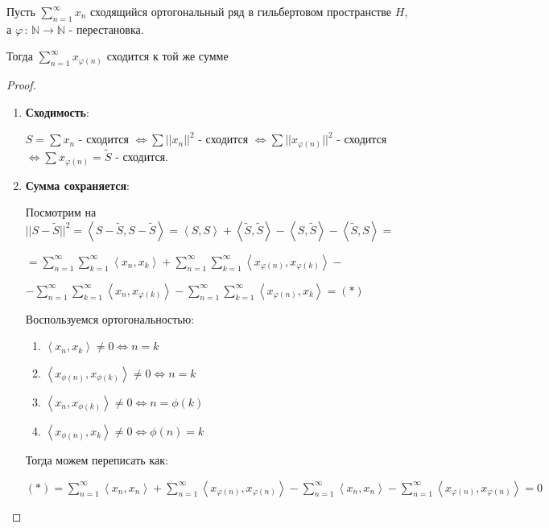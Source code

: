 \begin{consequence}
    Пусть $\sum_{n = 1}^{\infty} x_n$ сходящийся ортогональный ряд в гильбертовом пространстве $H$, а $\varphi \, : \, \mathbb{N} \to \mathbb{N}$ - перестановка.
    
    Тогда $\sum_{n = 1}^\infty x_{\varphi(n)} $ сходится к той же сумме 
\end{consequence}

\begin{proof}
    \begin{enumerate}
        \item {
        \textbf{Сходимость}:

        $S = \sum x_n$ - сходится $\Longleftrightarrow \sum ||x_n||^2$ - сходится $\Longleftrightarrow \sum ||x_{\varphi(n)}||^2$ - сходится $\Longleftrightarrow \sum x_{\varphi(n)} = \tilde{S}$ - сходится.
        }
        \item {
        \textbf{Сумма сохраняется}:

        
        Посмотрим на $||S - \tilde{S}||^2 = \left <  S - \tilde{S}, S - \tilde{S} \right > = \left < S, S \right > + \left < \tilde{S}, \tilde{S} \right > - \left < S, \tilde{S} \right > - \left < \tilde{S}, S \right > = $
        
        $= \sum_{n = 1}^\infty \sum_{k = 1}^\infty \left < x_n, x_k \right > + \sum_{n = 1}^\infty \sum_{k = 1}^\infty \left < x_{\varphi(n)}, x_{\varphi(k)} \right > -$
        
        $- \sum_{n = 1}^\infty \sum_{k = 1}^\infty \left < x_n, x_{\varphi(k)} \right > - \sum_{n = 1}^\infty \sum_{k = 1}^\infty \left < x_{\varphi(n)}, x_k \right > = (*)$

        Воспользуемся ортогональностью:

        \begin{enumerate}
            \item {
                $\left< x_n, x_k \right> \neq 0 \Leftrightarrow n = k$
            }
            \item {
                $\left< x_{\phi(n)}, x_{\phi(k)} \right> \neq 0 \Leftrightarrow n = k$
            }
            \item {
                $\left< x_n, x_{\phi(k)} \right> \neq 0 \Leftrightarrow n = \phi(k)$
            }
            \item {
                $\left< x_{\phi(n)}, x_k \right> \neq 0 \Leftrightarrow \phi(n) = k$
            }
        \end{enumerate}

        Тогда можем переписать как:
        
        $(*) = \sum_{n = 1}^\infty \left < x_n , x_n \right > + \sum_{n = 1}^\infty \left < x_{\varphi(n)}, x_{\varphi(n)} \right > - \sum_{n = 1}^\infty \left < x_n, x_n \right > - \sum_{n = 1}^\infty \left < x_{\varphi(n)}, x_{\varphi(n)} \right > = 0 $
        }
    \end{enumerate}
\end{proof}

